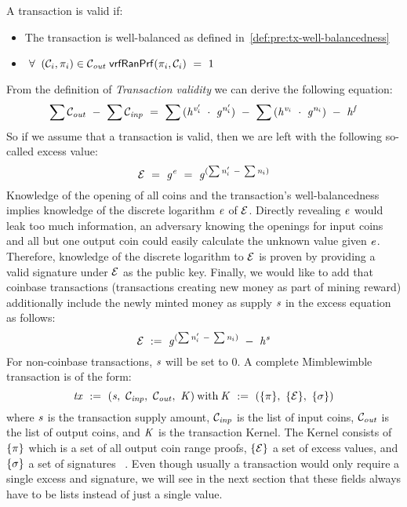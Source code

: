 \begin{definition} \label{def:pre:tx-mw-validity}
    A transaction is valid if:
    \begin{itemize}
        \item The transaction is well-balanced as defined in~\cref{def:pre:tx-well-balancedness}
        \item $\;\forall\; \; (\mathcal{C}_i, \pi_i) \in \mathcal{C}_{\mathit{out}} \; \mathsf{vrfRanPrf}(\pi_i,\mathcal{C}_i) ~=~ 1$
    \end{itemize}
\end{definition}

From the definition of \emph{Transaction validity} we can derive the following equation:
\[ \sum{\mathcal{C}_{\mathit{out}}} ~-~ \sum{\mathcal{C}_{\mathit{inp}}} ~=~ \sum{(\mathit{h}^{\mathit{v}'_i} ~\cdot~\mathit{g}^{\mathit{n}'_i})} ~-~ \sum{(\mathit{h}^{\mathit{v}_i} ~\cdot~\mathit{g}^{\mathit{n}_i})} ~-~ \mathit{h}^{\mathit{f}} \]
So if we assume that a transaction is valid, then we are left with the following so-called excess value:
\[ \mathcal{E} ~=~ \mathit{g}^{\mathit{e}} ~=~ \mathit{g}^{(\sum{\mathit{n}'_i} ~-~ \sum{\mathit{n}_i})} \]
Knowledge of the opening of all coins and the transaction's well-balancedness implies knowledge of the discrete logarithm $\mathit{e}$ of $\mathcal{E}$.
Directly revealing $\mathit{e}$ would leak too much information, an adversary knowing the openings for input coins and all but one output coin could easily calculate the unknown value given $\mathit{e}$.
Therefore, knowledge of the discrete logarithm to $\mathcal{E}$ is proven by providing a valid signature under $\mathcal{E}$ as the public key.
Finally, we would like to add that coinbase transactions (transactions creating new money as part of mining reward) additionally include the newly minted money as supply $\mathit{s}$ in the excess equation as follows:
\[ \mathcal{E} ~:=~ \mathit{g}^{(\sum{\mathit{n}'_i} ~-~ \sum{\mathit{n}_i})} ~-~ \mathit{h}^{\mathit{s}} \]
For non-coinbase transactions, $\mathit{s}$ will be set to 0.
A complete Mimblewimble transaction is of the form:
\[ \mathit{tx} ~:=~ (\mathit{s} ,~ \mathcal{C}_{\mathit{inp}} ,~ \mathcal{C}_{\mathit{out}} ,~ \mathit{K})\:\text{with}\:\mathit{K} ~:=~ (\{\pi\} ,~ \{\mathcal{E}\} ,~ \{\sigma\}) \]
where $\mathit{s}$ is the transaction supply amount, $\mathcal{C}_{\mathit{inp}}$ is the list of input coins, $\mathcal{C}_{\mathit{out}}$ is the list of output coins, and $\mathit{K}$ is the transaction Kernel.
The Kernel consists of $\{\pi\}$ which is a set of all output coin range proofs, $\{\mathcal{E}\}$ a set of excess values, and $\{\sigma\}$ a set of signatures ~\cite{fuchsbauer2019aggregate}.
Even though usually a transaction would only require a single excess and signature, we will see in the next section that these fields always have to be lists instead of just a single value.

